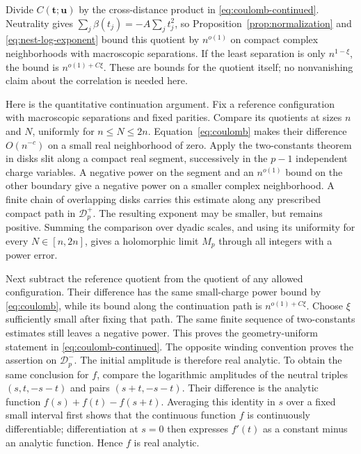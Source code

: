Divide $C(\mathbf t;\mathbf u)$ by the cross-distance product in
\eqref{eq:coulomb-continued}.  Neutrality gives
$\sum_j\beta(t_j)=-A\sum_jt_j^2$, so
Proposition~\ref{prop:normalization} and
\eqref{eq:nest-log-exponent} bound this quotient by $n^{o(1)}$
on compact complex neighborhoods with macroscopic separations.
If the least separation is only $n^{1-\xi}$, the bound is
$n^{o(1)+C\xi}$.  These are bounds for the quotient itself; no
nonvanishing claim about the correlation is needed here.

Here is the quantitative continuation argument.  Fix a reference
configuration with macroscopic separations and fixed parities.  Compare
its quotients at sizes $n$ and $N$, uniformly for $n\le N\le2n$.
Equation~\eqref{eq:coulomb} makes their difference $O(n^{-c})$ on
a small real neighborhood of zero.  Apply the two-constants theorem
in disks slit along a compact real segment, successively in the
$p-1$ independent charge variables.  A negative power on the segment
and an $n^{o(1)}$ bound on the other boundary give a negative power
on a smaller complex neighborhood.  A finite chain of overlapping
disks carries this estimate along any prescribed compact path in
$\mathcal D_p^+$.  The resulting exponent may be smaller, but remains
positive.  Summing the comparison over dyadic scales, and using its
uniformity for every $N\in[n,2n]$, gives a holomorphic limit $M_p$
through all integers with a power error.

Next subtract the reference quotient from the quotient of any allowed
configuration.  Their difference has the same small-charge power bound
by \eqref{eq:coulomb}, while its bound along the continuation path is
$n^{o(1)+C\xi}$.  Choose $\xi$ sufficiently small after fixing that
path.  The same finite sequence of two-constants estimates still leaves
a negative power.  This proves the geometry-uniform statement in
\eqref{eq:coulomb-continued}.  The opposite winding convention proves
the assertion on $\mathcal D_p^-$.  The initial amplitude is therefore
real analytic.  To obtain the same conclusion for $f$, compare the
logarithmic amplitudes of the neutral triples $(s,t,-s-t)$ and pairs
$(s+t,-s-t)$.  Their difference is the analytic function
$f(s)+f(t)-f(s+t)$.  Averaging this identity in $s$ over a fixed small
interval first shows that the continuous function $f$ is continuously
differentiable; differentiation at $s=0$ then expresses $f'(t)$ as a
constant minus an analytic function.  Hence $f$ is real analytic.

